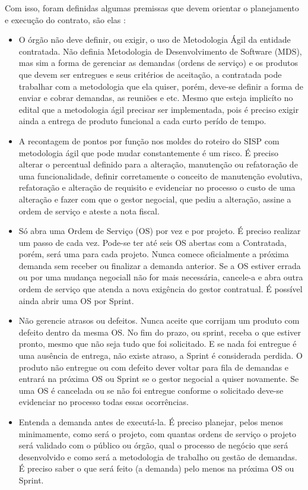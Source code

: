Com isso, foram definidas algumas premissas que devem orientar o planejamento e execução do contrato, são elas  \cite{parente}:
\begin{itemize}
\item O órgão não deve definir, ou exigir, o uso de Metodologia Ágil da entidade contratada. Não definia Metodologia de Desenvolvimento de Software (MDS), mas sim a forma de gerenciar as demandas (ordens de serviço) e os produtos que devem ser entregues e seus critérios de aceitação, a contratada pode trabalhar com a metodologia que ela quiser, porém, deve-se definir a forma de enviar e cobrar demandas, as reuniões e etc. Mesmo que esteja implicíto no edital que a metodologia ágil precisar ser implementada, pois é preciso exigir ainda a entrega de produto funcional a cada curto perído de tempo.
\item A recontagem de pontos por função nos moldes do roteiro do SISP com metodologia ágil que pode mudar constantemente é um risco. É preciso alterar o percentual definido para a alteração, manutenção ou refatoração de uma funcionalidade, definir corretamente o conceito de manutenção evolutiva, refatoração e alteração de requisito e evidenciar no processo o custo de uma alteração e fazer com que o gestor negocial, que pediu a alteração, assine a ordem de serviço e ateste a nota fiscal.
\item Só abra uma Ordem de Serviço (OS) por vez e por projeto. É preciso realizar um passo de cada vez. Pode-se ter até seis OS abertas com a Contratada, porém, será uma para cada projeto. Nunca comece oficialmente a próxima demanda sem receber ou finalizar a demanda anterior. Se a OS estiver errada ou por uma mudança negociall não for mais necessária, cancele-a e abra outra ordem de serviço que atenda a nova exigência do gestor contratual. É possível ainda abrir uma OS por Sprint.
\item Não gerencie atrasos ou defeitos. Nunca aceite que corrijam um produto com defeito dentro da mesma OS. No fim do prazo, ou sprint, receba o que estiver pronto, mesmo que não seja tudo que foi solicitado. E se nada foi entregue é uma ausência de entrega, não existe atraso, a Sprint é considerada perdida. O produto não entregue ou com defeito dever voltar para fila de demandas e entrará na próxima OS ou Sprint se o gestor negocial a quiser novamente. Se uma OS é cancelada ou se não foi entregue conforme o solicitado deve-se evidenciar no processo todas essas ocorrências.
\item Entenda a demanda antes de executá-la. É preciso planejar, pelos menos minimamente, como será o projeto, com quantas ordens de serviço o projeto será validado com o público ou órgão, qual o processo de negócio que será desenvolvido e como será a metodologia de trabalho ou gestão de demandas. É preciso saber o que será feito (a demanda) pelo menos na próxima OS ou Sprint.

\end{itemize}
